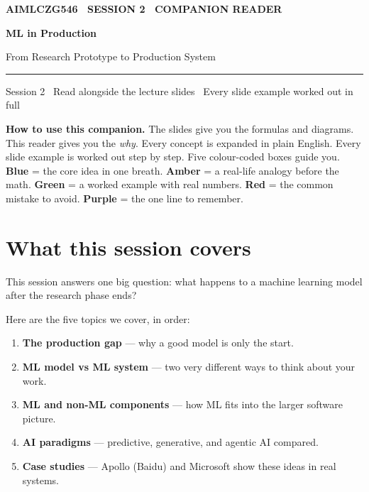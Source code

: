 \documentclass[a4paper,11pt]{article}
\providecommand{\addfontfeatureslike}[1]{#1}
\newcommand{\titlebanner}[4]{%
  \begin{tcolorbox}[
    enhanced, breakable=false,
    colback=navy, colframe=navy,
    boxrule=0pt, arc=3pt, outer arc=3pt,
    left=16pt, right=16pt, top=16pt, bottom=16pt,
    before skip=2pt, after skip=14pt,
    width=\linewidth ]
    {\sffamily\footnotesize\bfseries\color{white!85}%
      \MakeUppercase{\addfontfeatureslike{#1}}}\par
    \vspace{6pt}
    {\sffamily\bfseries\fontsize{30}{34}\selectfont\color{white} #2\par}
    \vspace{5pt}
    {\sffamily\large\color{white!88} #3\par}
    \vspace{9pt}
    {\color{white!55}\rule{\linewidth}{0.4pt}}\par
    \vspace{6pt}
    {\sffamily\footnotesize\color{white!82} #4\par}
  \end{tcolorbox}%
}
\begin{document}

\thispagestyle{fancy}

\titlebanner
  {AIMLCZG546 \textperiodcentered\ Session 2 \textperiodcentered\ Companion Reader}
  {ML in Production}
  {From Research Prototype to Production System}
  {Session 2 \textperiodcentered\ Read alongside the lecture slides \textperiodcentered\ Every slide example worked out in full}

\noindent\textbf{How to use this companion.}
The slides give you the formulas and diagrams. This reader gives you the \emph{why}.
Every concept is expanded in plain English. Every slide example is worked out step by step.
Five colour-coded boxes guide you.
\textcolor{intuFrame}{\textbf{Blue}} = the core idea in one breath.
\textcolor{everyFrame}{\textbf{Amber}} = a real-life analogy before the math.
\textcolor{workFrame}{\textbf{Green}} = a worked example with real numbers.
\textcolor{watchFrame}{\textbf{Red}} = the common mistake to avoid.
\textcolor{keyFrame}{\textbf{Purple}} = the one line to remember.

\medskip

\section{What this session covers}

This session answers one big question: what happens to a machine learning model after
the research phase ends?

Here are the five topics we cover, in order:

\begin{enumerate}
  \item \textbf{The production gap} --- why a good model is only the start.
  \item \textbf{ML model vs ML system} --- two very different ways to think about your work.
  \item \textbf{ML and non-ML components} --- how ML fits into the larger software picture.
  \item \textbf{AI paradigms} --- predictive, generative, and agentic AI compared.
  \item \textbf{Case studies} --- Apollo (Baidu) and Microsoft show these ideas in real systems.
\end{enumerate}
\end{document}
